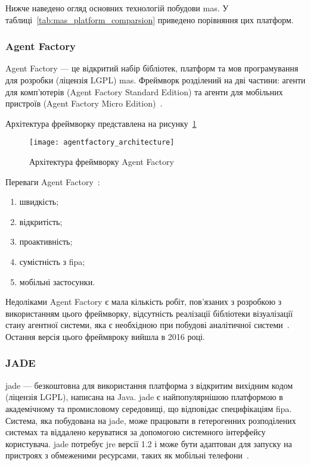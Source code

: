 Нижче наведено огляд основних технологій побудови \acrshort{mas}. 
У таблиці~\ref{tab:mas_platform_comparsion} приведено порівняння цих платформ.

\subsubsection{Agent Factory}
Agent Factory --- це відкритий набір бібліотек, платформ та мов програмування для розробки (ліцензія LGPL) \acrshort{mas}. 
Фреймворк розділений на дві частини: агенти для комп'ютерів (Agent Factory Standard Edition) та агенти для мобільних пристроїв (Agent Factory Micro Edition)~\cite{Kravari2015}.

Архітектура фреймворку представлена на рисунку~\ref{fig:agentfactory_architecture}

\begin{figure}[H]
	\centering
	\texttt{[image: agentfactory\_architecture]}
	\caption{Архітектура фреймворку Agent Factory~\cite{agentfactory}}
	\label{fig:agentfactory_architecture}
\end{figure}

Переваги Agent Factory~\cite{Kravari2015}:
\begin{enumerate}[label={\arabic*)}]
	\item швидкість;
	\item відкритість;
	\item проактивність;
	\item сумістність з \acrshort{fipa};
	\item мобільні застосунки.
\end{enumerate}

Недоліками Agent Factory є мала кількість робіт, пов'язаних з розробкою з використанням цього фреймворку, відсутність реалізації бібліотеки візуалізації стану агентної системи, яка є необхідною при побудові аналітичної системи~\cite{Kravari2015}. 
Остання версія цього фреймвроку вийшла в 2016 році.

\subsubsection{JADE}
\acrshort{jade} --- безкоштовна для використання платформа з відкритим вихідним кодом (ліцензія LGPL), написана на Java.
\acrshort{jade} є найпопулярнішою платформою в академічному та промисловому середовищі, що відповідає специфікаціям \acrshort{fipa}.
Система, яка побудована на \acrshort{jade}, може працювати в гетерогенних розподілених системах та віддалено керуватися за допомогою системного інтерфейсу користувача.
\acrshort{jade} потребує \acrshort{jre} версії 1.2 і може бути адаптован для запуску на пристроях з обмеженими ресурсами, таких як мобільні телефони~\cite{Kravari2015}.

